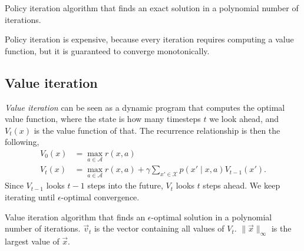 \begin{algorithm}[h]
  \caption{Policy iteration algorithm that finds an exact solution in a
  polynomial number of iterations.}
  \label{alg:policy-iteration}
  \begin{algorithmic}
      \EndWhile
      \State {\Return $\pi$}
    \EndFunction
  \end{algorithmic}
\end{algorithm}

Policy iteration is expensive, because every iteration requires computing a
value function, but it is guaranteed to converge monotonically.

\subsection{Value iteration}

\textit{Value iteration} can be seen as a dynamic program that computes the
optimal value function, where the state is how many timesteps $t$ we look
ahead, and $V_t(x)$ is the value function of that. The recurrence relationship
is then the following,
\begin{align*}
  V_0(x) &= \max_{a\in\mathcal{A}} r(x,a) \\
  V_t(x) &= \max_{a\in\mathcal{A}} r(x, a) + \gamma \sum_{x'\in\mathcal{X}} p(x'\mid x,a) V_{t-1}(x')
.\end{align*}
Since $V_{t-1}$ looks $t-1$ steps into the future, $V_t$ looks $t$ steps ahead.
We keep iterating until $\epsilon$-optimal
convergence.

\begin{algorithm}[h]
  \caption{Value iteration algorithm that finds an $\epsilon$-optimal solution
  in a polynomial number of iterations. $\vec{v}_t$ is the vector containing
  all values of $V_t$. $\|\vec{x}\|_{\infty}$ is the largest value of
  $\vec{x}$.}
  \label{alg:value-iteration}
  \begin{algorithmic}
       
      \EndFor

        \EndFor
      \EndWhile
    \EndFunction
  \end{algorithmic}
\end{algorithm}

